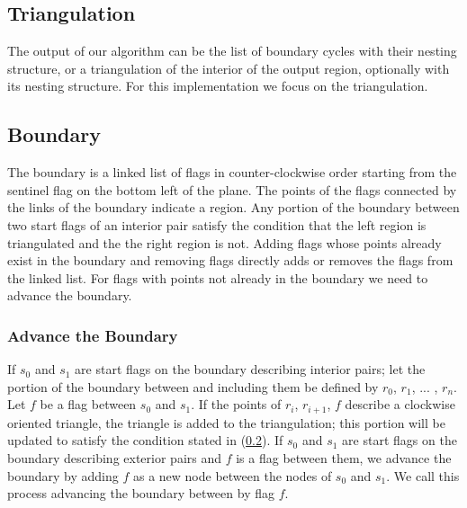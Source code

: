\documentclass[11pt]{article}
\begin{document}
\subsection{Triangulation}
The output of our algorithm can be the list of boundary cycles with their nesting structure, or a triangulation of the interior of the output region, optionally with its nesting structure. For this implementation we focus on the triangulation.

\subsection{Boundary} \label{sec boundary}
The boundary is a linked list of flags in counter-clockwise order starting from the sentinel flag on the bottom left of the plane.
The points of the flags connected by the links of the boundary indicate a region.
Any portion of the boundary between two start flags of an interior pair satisfy the condition that the left region is triangulated and the the right region is not.
Adding flags whose points already exist in the boundary and removing flags directly adds or removes the flags from the linked list.
For flags with points not already in the boundary we need to advance the boundary.

\subsubsection{Advance the Boundary}
If $s_0$ and $s_1$ are start flags on the boundary describing interior pairs; let the portion of the boundary between and including them be defined by $r_0$, $r_1$, ... , $r_n$.
Let $f$ be a flag between $s_0$ and $s_1$.
If the points of $r_i$, $r_{i+1}$, $f$ describe a clockwise oriented triangle, the triangle is added to the triangulation; this portion will be updated to satisfy the condition stated in (\ref{sec boundary}).
If $s_0$ and $s_1$ are start flags on the boundary describing exterior pairs and $f$ is a flag between them,
we advance the boundary by adding $f$ as a new node between the nodes of $s_0$ and $s_1$.
We call this process advancing the boundary between by flag $f$.
\end{document}
